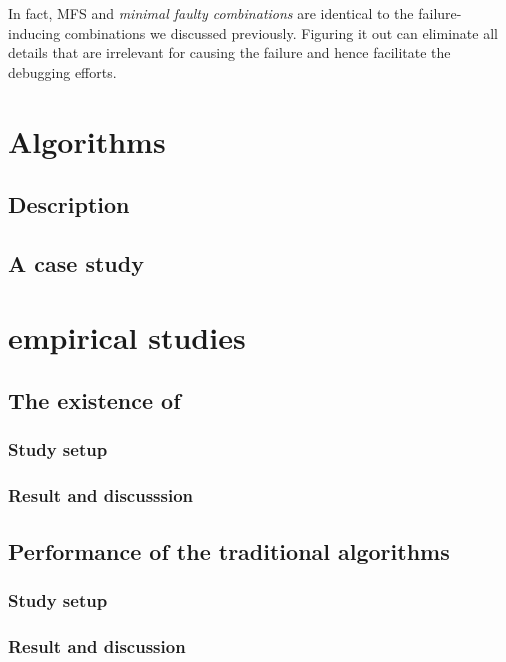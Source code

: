 \documentclass{sig-alternate}
\begin{document}
In fact, MFS and \emph{minimal faulty combinations} are identical to the failure-inducing combinations we discussed previously. Figuring it out can eliminate all details that are irrelevant for causing the failure and hence facilitate the debugging efforts.

\section{Algorithms}

\subsection{Description}

\subsection{A case study}

\section{empirical studies}


\subsection{The existence of }


\subsubsection{Study setup}


\subsubsection{Result and discusssion}


\subsection{Performance of the traditional algorithms}

\subsubsection{Study setup}

\subsubsection{Result and discussion}
\end{document}
